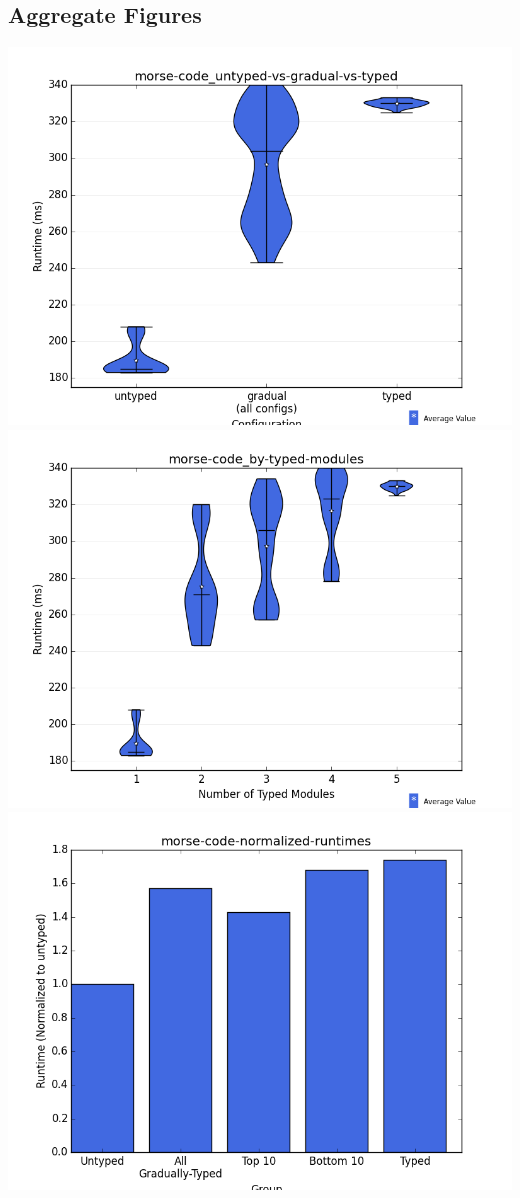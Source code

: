 \documentclass{article}
\begin{document}
\subsection{Aggregate Figures}
\includegraphics[width=\textwidth]{morse-code_untyped-vs-gradual-vs-typed-violin.png}
\includegraphics[width=\textwidth]{morse-code_by-typed-modules-violin.png}
\includegraphics[width=\textwidth]{morse-code-normalized-runtimes-bar.png}
\end{document}
